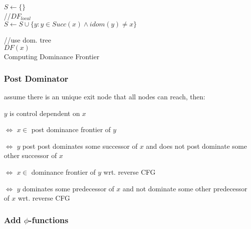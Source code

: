 \documentclass[8pt]{extarticle}
\begin{document}
\begin{multicols*}{2}
  \begin{algorithm}[H]
    $S \leftarrow \{\}$\\
    //$DF_{local}$\\
    $S \leftarrow S \cup \{ y: y \in Succ(x) \wedge idom(y) \neq x\}$

    //use dom. tree\\
    $DF(x)$\\
    \caption{Computing Dominance Frontier\label{Algo_dominance_frontier}}
  \end{algorithm}

  \subsubsection{Post Dominator}

  assume there is an unique exit node that all nodes can reach, then:

  $y$ is control dependent on $x$

  $\iff$ $x \in$ post dominance frontier of $y$

  $\iff$ $y$ post post dominates some successor of $x$ and does not post dominate some other successor of $x$

  $\iff$ $x\in$ dominance frontier of $y$ wrt. reverse CFG
  
  $\iff$ $y$ dominates some predecessor of $x$ and not dominate some other predecessor of $x$ wrt. reverse CFG
  
  \subsubsection{Add $\phi$-functions}


\end{multicols*}
\end{document}
